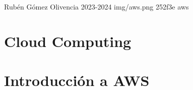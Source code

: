 \documentclass{\ClassPath/yukibook}
\begin{document}
    {Rubén Gómez Olivencia}  %
    {2023-2024}    %
    {} %
    {} %
    {} %
    {img/aws.png} %
    {252f3e}
    {aws} %

    \coverpage
    \graphicspath{{../../yukibook.cls/}}
    \licensepage

    \tableofcontents

    \graphicspath{{img/}}

    \part{Cloud Computing}
    
    
    \part{Introducción a AWS}
    
    
%    
%    
%    
\end{document}
